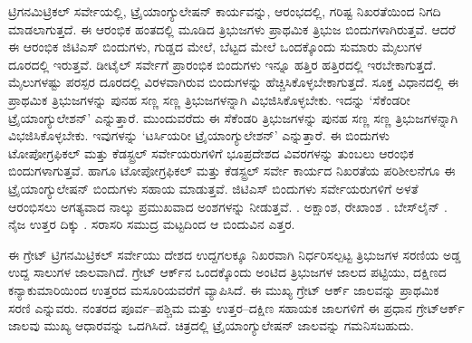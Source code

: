 ಟ್ರಿಗನಮಿಟ್ರಿಕಲ್​ ಸರ್ವೇಯಲ್ಲಿ, ಟ್ರೈಯಾಂಗ್ಯುಲೇಷನ್​ ಕಾರ್ಯವನ್ನು, ಆರಂಭದಲ್ಲಿ, ಗರಿಷ್ಟ ನಿಖರತೆಯಿಂದ ನಿಗದಿ ಮಾಡಲಾಗುತ್ತದೆ. ಈ ಆರಂಭಿಕ ಹಂತದಲ್ಲಿ ಮೂಡಿದ ತ್ರಿಭುಜಗಳು ಪ್ರಾಥಮಿಕ ತ್ರಿಭುಜ ಬಿಂದುಗಳಾಗಿರುತ್ತವೆ. ಆದರೆ ಈ ಆರಂಭಿಕ ಜಿಟಿಎಸ್​ ಬಿಂದುಗಳು, ಗುಡ್ಡದ ಮೇಲೆ, ಬೆಟ್ಟದ ಮೇಲೆ ಒಂದಕ್ಕೊಂದು ಸುಮಾರು  ಮೈಲುಗಳ ದೂರದಲ್ಲಿ ಇರುತ್ತವೆ. ಡೀಟೈಲ್​ ಸರ್ವೇಗೆ ಪ್ರಾರಂಭಿಕ ಬಿಂದುಗಳು ಇನ್ನೂ ಹತ್ತಿರ ಹತ್ತಿರದಲ್ಲಿ ಇರಬೇಕಾಗುತ್ತದೆ.  ಮೈಲುಗಳಷ್ಟು ಪರಸ್ಪರ ದೂರದಲ್ಲಿ ವಿರಳವಾಗಿರುವ ಬಿಂದುಗಳನ್ನು ಹೆಚ್ಚಿಸಿಕೊಳ್ಳಬೇಕಾಗುತ್ತದೆ. ಸೂಕ್ತ ವಿಧಾನದಲ್ಲಿ ಈ ಪ್ರಾಥಮಿಕ ತ್ರಿಭುಜಗಳನ್ನು ಪುನಹ ಸಣ್ಣ ಸಣ್ಣ ತ್ರಿಭುಜಗಳನ್ನಾಗಿ ವಿಭಜಿಸಿಕೊಳ್ಳಬೇಕು. ಇದನ್ನು ‘ಸೆಕೆಂಡರೀ ಟ್ರೈಯಾಂಗ್ಯುಲೇಶನ್​’ ಎನ್ನುತ್ತಾರೆ. ಮುಂದುವರೆದು ಈ ಸೆಕೆಂಡರಿ ತ್ರಿಭುಜಗಳನ್ನು ಪುನಹ ಸಣ್ಣ ಸಣ್ಣ ತ್ರಿಭುಜಗಳನ್ನಾಗಿ ವಿಭಜಿಸಿಕೊಳ್ಳಬೇಕು. ಇವುಗಳನ್ನು ‘ಟರ್ಸಿಯರೀ ಟ್ರೈಯಾಂಗ್ಯುಲೇಶನ್​’ ಎನ್ನುತ್ತಾರೆ. ಈ ಬಿಂದುಗಳು ಟೋಪೋಗ್ರಫಿಕಲ್​ ಮತ್ತು ಕೆಡಸ್ಟ್ರಲ್​ ಸರ್ವೇಯರುಗಳಿಗೆ ಭೂಪ್ರದೇಶದ ವಿವರಗಳನ್ನು ತುಂಬಲು ಆರಂಭಿಕ ಬಿಂದುಗಳಾಗುತ್ತವೆ. ಹಾಗೂ ಟೋಪೋಗ್ರಫಿಕಲ್​ ಮತ್ತು ಕೆಡಸ್ಟ್ರಲ್​ ಸರ್ವೇ ಕಾರ್ಯದ ನಿಖರತೆಯ ಪರಿಶೀಲನೆಗೂ ಈ ಟ್ರೈಯಾಂಗ್ಯುಲೇಷನ್​ ಬಿಂದುಗಳು ಸಹಾಯ ಮಾಡುತ್ತವೆ. ಜಿಟಿಎಸ್​ ಬಿಂದುಗಳು ಸರ್ವೇಯರುಗಳಿಗೆ ಅಳತೆ ಆರಂಭಿಸಲು ಅಗತ್ಯವಾದ ನಾಲ್ಕು ಪ್ರಮುಖವಾದ ಅಂಶಗಳನ್ನು ನೀಡುತ್ತವೆ. . ಅಕ್ಷಾಂಶ, ರೇಖಾಂಶ . ಬೇಸ್​ ಲೈನ್​ . ನೈಜ ಉತ್ತರ ದಿಕ್ಕು . ಸರಾಸರಿ ಸಮುದ್ರ ಮಟ್ಟದಿಂದ ಆ ಬಿಂದುವಿನ ಎತ್ತರ.

ಈ ಗ್ರೇಟ್​ ಟ್ರಿಗನಮಿಟ್ರಿಕಲ್​ ಸರ್ವೇಯು ದೇಶದ ಉದ್ದಗಲಕ್ಕೂ ನಿಖರವಾಗಿ ನಿರ್ಧರಿಸಲ್ಪಟ್ಟ ತ್ರಿಭುಜಗಳ ಸರಣಿಯ ಅಡ್ಡ ಉದ್ದ ಸಾಲುಗಳ ಜಾಲವಾಗಿದೆ. ಗ್ರೇಟ್​ ಆರ್ಕ್‌ನ ಒಂದಕ್ಕೊಂದು ಅಂಟಿದ ತ್ರಿಭುಜಗಳ ಜಾಲದ ಪಟ್ಟಿಯು, ದಕ್ಷಿಣದ ಕನ್ಯಾಕುಮಾರಿಯಿಂದ ಉತ್ತರದ ಮಸೂರಿಯವರೆಗೆ ವ್ಯಾಪಿಸಿದೆ. ಈ ಮುಖ್ಯ ಗ್ರೇಟ್​ ಆರ್ಕ್ ಜಾಲವನ್ನು ಪ್ರಾಥಮಿಕ ಸರಣಿ ಎನ್ನುವರು. ನಂತರದ ಪೂರ್ವ–ಪಶ್ಚಿಮ ಮತ್ತು ಉತ್ತರ–ದಕ್ಷಿಣ ಸಹಾಯಕ ಜಾಲಗಳಿಗೆ ಈ ಪ್ರಧಾನ ಗ್ರೇಟ್​ ಆರ್ಕ್ ಜಾಲವು ಮುಖ್ಯ ಆಧಾರವನ್ನು ಒದಗಿಸಿದೆ. ಚಿತ್ರದಲ್ಲಿ ಟ್ರೈಯಾಂಗ್ಯುಲೇಷನ್​ ಜಾಲವನ್ನು ಗಮನಿಸಬಹುದು.

